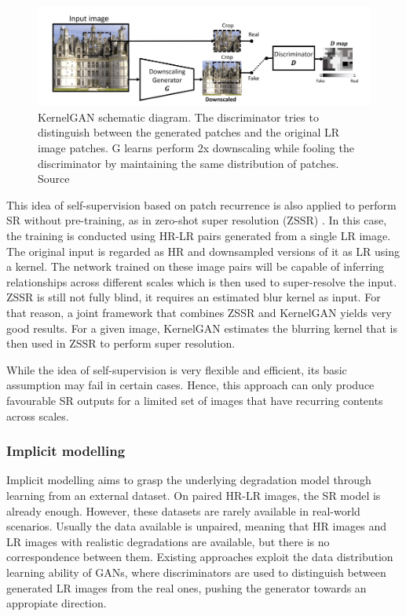         \begin{figure}[H]
            \centering
            \includegraphics[width=\textwidth]{Includes/2-kernelGAN.png}
            \caption{KernelGAN schematic diagram. The discriminator tries to distinguish between the generated patches and the original LR image patches. G learns perform 2x downscaling while fooling the discriminator by maintaining the same distribution of patches. Source \cite{bellkligler2020blind}}    
            \label{fig:2-kernelGAN}
        \end{figure}

        This idea of self-supervision based on patch recurrence is also applied to perform SR without pre-training, as in zero-shot super resolution (ZSSR) \cite{shocher2017zeroshot}.
        In this case, the training is conducted using HR-LR pairs generated from a single LR image.
        The original input is regarded as HR and downsampled versions of it as LR using a kernel. 
        The network trained on these image pairs will be capable of inferring relationships across different scales which is then used to super-resolve the input.
        ZSSR is still not fully blind, it requires an estimated blur kernel as input. 
        For that reason, a joint framework that combines ZSSR and KernelGAN yields very good results.
        For a given image, KernelGAN estimates the blurring kernel that is then used in ZSSR to perform super resolution.

        While the idea of self-supervision is very flexible and efficient, its basic assumption may fail in certain cases.
        Hence, this approach can only produce favourable SR outputs for a limited set of images that have recurring contents across scales.



        \subsubsection{Implicit modelling} \label{subsubsec:implicit-modelling}

        Implicit modelling aims to grasp the underlying degradation model through learning from an external dataset.
        On paired HR-LR images, the SR model is already enough. However, these datasets are rarely available in real-world scenarios.
        Usually the data available is unpaired, meaning that HR images and LR images with realistic degradations are available, but there is no correspondence between them.
        Existing approaches exploit the data distribution learning ability of GANs, where discriminators are used to distinguish between generated LR images from the real ones, pushing the generator towards an appropiate direction.
        

